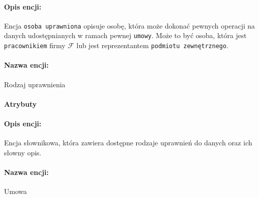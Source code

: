 \documentclass{article}
\begin{document}
\paragraph{Opis encji: \\}
Encja \texttt{osoba uprawniona} opisuje osobę, która może dokonać pewnych operacji na danych udostępnianych w ramach pewnej \texttt{umowy}. Może to być osoba, która jest \texttt{pracownikiem} firmy $\mathcal{F}$ lub jest reprezentantem \texttt{podmiotu zewnętrznego}.  
\paragraph{Nazwa encji:\\ }
Rodzaj uprawnienia
\paragraph{Atrybuty\\ }
\begin{table}[H]

\caption{Tabela z opisem encji.} 
\end{table}

\paragraph{Opis encji: \\}
Encja słownikowa, która zawiera dostępne rodzaje uprawnień do danych oraz ich słowny opis.
\paragraph{Nazwa encji:\\ }
Umowa
\end{document}
